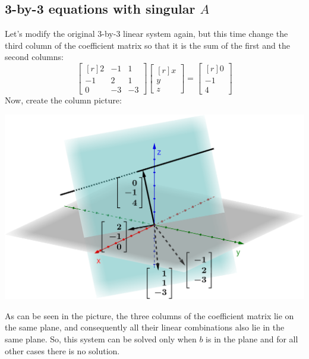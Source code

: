 \documentclass[../main.tex]{subfiles}
\begin{document}
\subsection{3-by-3 equations with singular \(A\)}
Let's modify the original 3-by-3 linear system again, but this time change the third column of the coefficient matrix so that it is the sum of the first and the second columns:
\[
    \begin{bmatrix*}[r]
        2 & -1 & 1 \\
        -1 & 2 & 1 \\
        0 & -3 & -3
    \end{bmatrix*}
    \begin{bmatrix*}[r]
        x \\
        y \\
        z
    \end{bmatrix*}
    =
    \begin{bmatrix*}[r]
        0 \\
        -1 \\
        4
    \end{bmatrix*}
\]
Now, create the column picture:

\begingroup
\centering
\includegraphics[width = \columnwidth]{../figures/fig07_3d-singular-col-pic/geogebra-derived}
\par
\endgroup
As can be seen in the picture, the three columns of the coefficient matrix lie on the same plane, and consequently all their linear combinations also lie in the same plane. So, this system can be solved only when \(b\) is in the plane and for all other cases there is no solution.
\vspace{0.5em}
\end{document}
